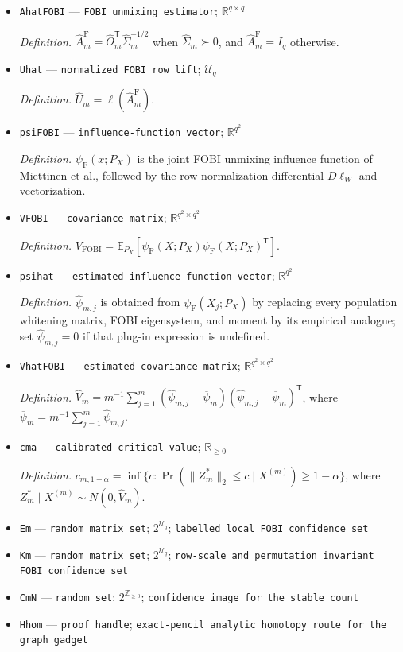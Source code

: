 \documentclass{article}
\begin{document}
\begin{itemize}
  \item \texttt{AhatFOBI} --- \texttt{FOBI unmixing estimator}; \(\mathbb R^{q\times q}\)
  \par\smallskip\noindent\emph{Definition.} \(\widehat A_m^{\mathrm F}=\widehat O_m^{\mathsf T}\widehat\Sigma_m^{-1/2}\) when \(\widehat\Sigma_m\succ0\), and \(\widehat A_m^{\mathrm F}=I_q\) otherwise.
  \item \texttt{Uhat} --- \texttt{normalized FOBI row lift}; \(\mathcal U_q\)
  \par\smallskip\noindent\emph{Definition.} \(\widehat U_m=\ell(\widehat A_m^{\mathrm F})\).
  \item \texttt{psiFOBI} --- \texttt{influence-\allowbreak{}function vector}; \(\mathbb R^{q^2}\)
  \par\smallskip\noindent\emph{Definition.} \(\psi_{\mathrm F}(x;P_X)\) is the joint FOBI unmixing influence function of Miettinen et al., followed by the row-normalization differential \(D\ell_W\) and vectorization.
  \item \texttt{VFOBI} --- \texttt{covariance matrix}; \(\mathbb R^{q^2\times q^2}\)
  \par\smallskip\noindent\emph{Definition.} \(V_{\mathrm{FOBI}}=\mathbb E_{P_X}[\psi_{\mathrm F}(X;P_X)\psi_{\mathrm F}(X;P_X)^{\mathsf T}]\).
  \item \texttt{psihat} --- \texttt{estimated influence-\allowbreak{}function vector}; \(\mathbb R^{q^2}\)
  \par\smallskip\noindent\emph{Definition.} \(\widehat\psi_{m,j}\) is obtained from \(\psi_{\mathrm F}(X_j;P_X)\) by replacing every population whitening matrix, FOBI eigensystem, and moment by its empirical analogue; set \(\widehat\psi_{m,j}=0\) if that plug-in expression is undefined.
  \item \texttt{VhatFOBI} --- \texttt{estimated covariance matrix}; \(\mathbb R^{q^2\times q^2}\)
  \par\smallskip\noindent\emph{Definition.} \(\widehat V_m=m^{-1}\sum_{j=1}^m(\widehat\psi_{m,j}-\overline\psi_m)(\widehat\psi_{m,j}-\overline\psi_m)^{\mathsf T}\), where \(\overline\psi_m=m^{-1}\sum_{j=1}^m\widehat\psi_{m,j}\).
  \item \texttt{cma} --- \texttt{calibrated critical value}; \(\mathbb R_{\geq0}\)
  \par\smallskip\noindent\emph{Definition.} \(c_{m,1-\alpha}=\inf\{c:\Pr(\|Z_m^*\|_2\leq c\mid X^{(m)})\geq1-\alpha\}\), where \(Z_m^*\mid X^{(m)}\sim N(0,\widehat V_m)\).
  \item \texttt{Em} --- \texttt{random matrix set}; \(2^{\mathcal U_q}\); \texttt{labelled local FOBI confidence set}
  \item \texttt{Km} --- \texttt{random matrix set}; \(2^{\mathcal U_q}\); \texttt{row-\allowbreak{}scale and permutation invariant FOBI confidence set}
  \item \texttt{CmN} --- \texttt{random set}; \(2^{\mathbb Z_{\geq0}}\); \texttt{confidence image for the stable count}
  \item \texttt{Hhom} --- \texttt{proof handle}; \texttt{exact-\allowbreak{}pencil analytic homotopy route for the graph gadget}
\end{itemize}
\end{document}
